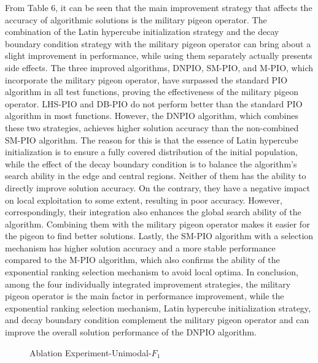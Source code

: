 \documentclass[preprint,review,compress,12pt]{elsarticle}
\begin{document}
From Table 6, it can be seen that the main improvement strategy that affects the accuracy of algorithmic solutions is the military pigeon operator. The combination of the Latin hypercube initialization strategy and the decay boundary condition strategy with the military pigeon operator can bring about a slight improvement in performance, while using them separately actually presents side effects. The three improved algorithms, DNPIO, SM-PIO, and M-PIO, which incorporate the military pigeon operator, have surpassed the standard PIO algorithm in all test functions, proving the effectiveness of the military pigeon operator. LHS-PIO and DB-PIO do not perform better than the standard PIO algorithm in most functions. However, the DNPIO algorithm, which combines these two strategies, achieves higher solution accuracy than the non-combined SM-PIO algorithm. The reason for this is that the essence of Latin hypercube initialization is to ensure a fully covered distribution of the initial population, while the effect of the decay boundary condition is to balance the algorithm's search ability in the edge and central regions. Neither of them has the ability to directly improve solution accuracy. On the contrary, they have a negative impact on local exploitation to some extent, resulting in poor accuracy. However, correspondingly, their integration also enhances the global search ability of the algorithm. Combining them with the military pigeon operator makes it easier for the pigeon to find better solutions. Lastly, the SM-PIO algorithm with a selection mechanism has higher solution accuracy and a more stable performance compared to the M-PIO algorithm, which also confirms the ability of the exponential ranking selection mechanism to avoid local optima. In conclusion, among the four individually integrated improvement strategies, the military pigeon operator is the main factor in performance improvement, while the exponential ranking selection mechanism, Latin hypercube initialization strategy, and decay boundary condition complement the military pigeon operator and can improve the overall solution performance of the DNPIO algorithm.



\begin{figure}[H]
\centering
{}
\caption{Ablation Experiment-Unimodal-$F_1$}
\end{figure}
\end{document}

